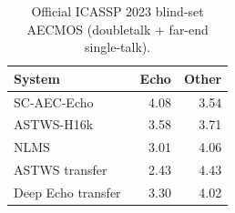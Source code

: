 \begin{table}[!t]
\caption{Official ICASSP 2023 blind-set AECMOS (doubletalk + far-end single-talk).}
\label{tab:blind-aecmos}
\centering
\begin{tabular}{lrr}
\hline
System & Echo & Other \\
\hline
SC-AEC-Echo & 4.08 & 3.54 \\
ASTWS-H16k~\cite{zhao2024astws} & 3.58 & 3.71 \\
NLMS & 3.01 & 4.06 \\
ASTWS transfer~\cite{zhao2024astws} & 2.43 & 4.43 \\
Deep Echo transfer~\cite{zhao2024deepecho} & 3.30 & 4.02 \\
\hline
\end{tabular}
\end{table}
